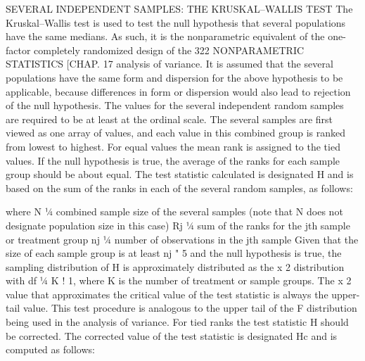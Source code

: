 SEVERAL INDEPENDENT SAMPLES: THE KRUSKAL–WALLIS TEST
The Kruskal–Wallis test is used to test the null hypothesis that several populations have the same
medians. As such, it is the nonparametric equivalent of the one-factor completely randomized design of the
322 NONPARAMETRIC STATISTICS [CHAP. 17
analysis of variance. It is assumed that the several populations have the same form and dispersion for the
above hypothesis to be applicable, because differences in form or dispersion would also lead to rejection of
the null hypothesis. The values for the several independent random samples are required to be at least at the
ordinal scale.
The several samples are first viewed as one array of values, and each value in this combined group is
ranked from lowest to highest. For equal values the mean rank is assigned to the tied values. If the null
hypothesis is true, the average of the ranks for each sample group should be about equal. The test statistic
calculated is designated H and is based on the sum of the ranks in each of the several random samples, as
follows:

where N ¼ combined sample size of the several samples
(note that N does not designate population size in this case)
Rj ¼ sum of the ranks for the jth sample or treatment group
nj ¼ number of observations in the jth sample
Given that the size of each sample group is at least nj " 5 and the null hypothesis is true, the sampling
distribution of H is approximately distributed as the x
2 distribution with df ¼ K ! 1, where K is the number
of treatment or sample groups. The x
2 value that approximates the critical value of the test statistic is
always the upper-tail value. This test procedure is analogous to the upper tail of the F distribution being
used in the analysis of variance.
For tied ranks the test statistic H should be corrected. The corrected value of the test statistic is designated
Hc and is computed as follows:
